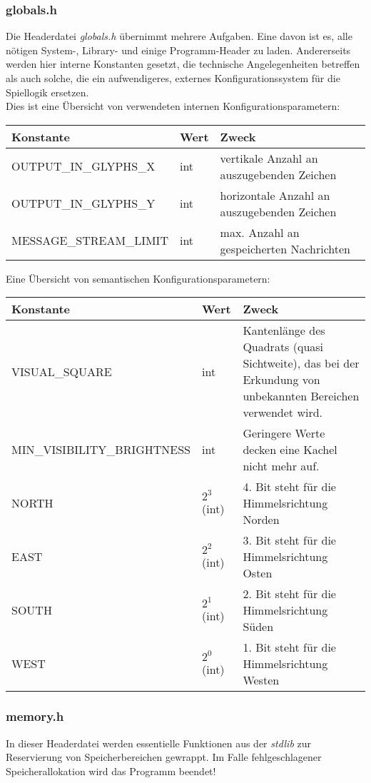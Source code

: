 \documentclass[11pt,a4paper,notitlepage]{report}
\begin{document}
			\subsubsection*{globals.h}
			Die Headerdatei \textit{globals.h} übernimmt mehrere Aufgaben. Eine davon ist es, alle nötigen \mbox{System-,} Library- und einige Programm-Header zu laden. Andererseits werden hier interne Konstanten gesetzt, die technische Angelegenheiten betreffen als auch solche, die ein aufwendigeres, externes Konfigurationssystem für die Spiellogik ersetzen. \\
	\vspace{1 cm}
	Dies ist eine Übersicht von verwendeten internen Konfigurationsparametern:\\
	\vspace{1 cm}
	\begin{tabular}{ p{5.0cm} | p{2.5cm} | p{8.0cm} }
		Konstante & Wert & Zweck \\
		\hline
		OUTPUT\_IN\_GLYPHS\_X & int & vertikale Anzahl an auszugebenden Zeichen \\
		OUTPUT\_IN\_GLYPHS\_Y & int & horizontale Anzahl an auszugebenden Zeichen \\
		MESSAGE\_STREAM\_LIMIT & int & max. Anzahl an gespeicherten Nachrichten 
	\end{tabular}
	\vspace{1 cm}
	Eine Übersicht von semantischen Konfigurationsparametern:\\
	\vspace{1 cm}
		\begin{tabular}{ p{5.5cm} | p{2.5cm} | p{8.0cm} }
		Konstante & Wert & Zweck \\
		\hline
		VISUAL\_SQUARE & int & Kantenlänge des Quadrats (quasi Sichtweite), das bei der Erkundung von unbekannten Bereichen verwendet wird. \\
		MIN\_VISIBILITY\_BRIGHTNESS & int & Geringere Werte decken eine Kachel nicht mehr auf. \\
		NORTH & $2^3$ (int) & 4. Bit steht für die Himmelsrichtung Norden \\
		EAST & $2^2$ (int) & 3. Bit steht für die Himmelsrichtung Osten \\
		SOUTH & $2^1$ (int) & 2. Bit steht für die Himmelsrichtung Süden \\
		WEST & $2^0$ (int) & 1. Bit steht für die Himmelsrichtung Westen 
	\end{tabular} 
	\newpage
	\subsubsection*{memory.h}
	In dieser Headerdatei werden essentielle Funktionen aus der \textit{stdlib} zur Reservierung von Speicherbereichen gewrappt. Im Falle fehlgeschlagener Speicherallokation wird das Programm beendet!
	
\end{document}
